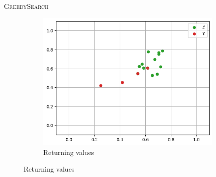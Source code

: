\begin{frame}{\textsc{GreedySearch}}
\begin{figure}[h]
\begin{subfigure}{0.31\textwidth}
            \includegraphics[width=\textwidth]{images/greedy-search-final}
            \caption{Returning values}
        \end{subfigure}
        \hfill
    \end{figure}
\end{frame}

